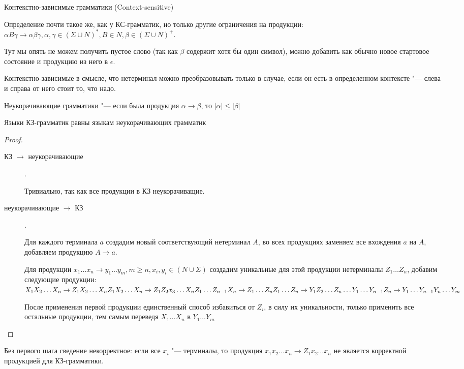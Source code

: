 \begin{Def}
Контекстно-зависимые грамматики (Context-sensitive)

Определение почти такое же, как у КС-грамматик, но только другие ограничения на продукции:
$\alpha B \gamma \to \alpha \beta \gamma, \alpha, \gamma \in (\Sigma \cup N)^*, B \in N, \beta \in (\Sigma \cup N)^+$. 

Тут мы опять не можем получить пустое слово (так как $\beta$ содержит хотя бы один символ), можно добавить как обычно новое стартовое состояние и продукцию из него в $\epsilon$.
\end{Def}
\begin{Rem}
Контекстно-зависимые в смысле, что нетерминал можно преобразовывать только в случае, если он есть в определенном контексте "--- слева и справа от него стоит то, что надо.
\end{Rem}
\begin{Def}
Неукорачивающие грамматики "--- если была продукция $\alpha \to \beta$, то $|\alpha| \leq |\beta|$
\end{Def}
\begin{theorem}
Языки КЗ-грамматик равны языкам неукорачивающих грамматик
\end{theorem}
\begin{proof}
\begin{description}
\item[КЗ $\to$ неукорачивающие]. 

Тривиально, так как все продукции в КЗ неукорачиващие.

\item[неукорачивающие $\to$ КЗ].

Для каждого терминала $a$ создадим новый соответствующий нетерминал $A$, во всех продукциях заменяем все вхождения $a$ на $A$, добавляем продукцию $A \to a$.

Для продукции $x_1 \dots x_n \to y_1 \dots y_m, m \geq n, x_i, y_i \in (N \cup \Sigma)$ создадим уникальные для этой продукции нетерминалы $Z_1 \dots Z_n$, добавим следующие продукции:
$\\
X_1 X_2 \dots X_n \to Z_1 X_2 \dots X_n \\
Z_1 X_2 \dots X_n \to Z_1 Z_2 x_3 \dots X_n \\
Z_1 \dots Z_{n - 1} X_n \to Z_1 \dots Z_n \\
Z_1 \dots Z_n \to Y_1 Z_2 \dots Z_n \\
\dots \\
Y_1 \dots Y_{n - 1} Z_n \to Y_1 \dots Y_{n - 1} Y_n \dots Y_m$

После применения первой продукции единственный способ избавиться от $Z_i$, в силу их уникальности, только применить все остальные продукции, 
тем самым переведя $X_1 \dots X_n$ в $Y_1 \dots Y_m$
\end{description}
\end{proof}
\begin{Rem}
Без первого шага сведение некорректное: если все $x_i$ "--- терминалы, то продукция $x_1 x_2 \dots x_n \to Z_1 x_2 \dots x_n$ не является корректной продукцией для КЗ-грамматики.
\end{Rem}

